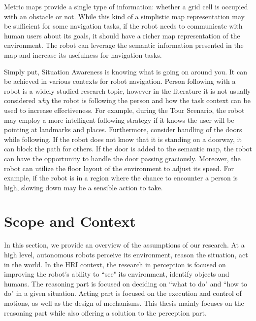 Metric maps provide a single type of information: whether a grid cell is occupied with an obstacle or not. While this kind of a simplistic map representation may be sufficient for some navigation tasks, if the robot needs to communicate with human users about its goals, it should have a richer map representation of the environment. The robot can leverage the semantic information presented in the map and increase its usefulness for navigation tasks.


Simply put, Situation Awareness is knowing what is going on around you. It can be achieved in various contexts for robot navigation. Person following with a robot is a widely studied research topic, however in the literature it is not usually considered \textit{why} the robot is following the person and how the task context can be used to increase effectiveness. For example, during the Tour Scenario, the robot may employ a more intelligent following strategy if it knows the user will be pointing at landmarks and places. Furthermore, consider handling of the doors while following. If the robot does not know that it is standing on a doorway, it can block the path for others. If the door is added to the semantic map, the robot can have the opportunity to handle the door passing graciously. Moreover, the robot can utilize the floor layout of the environment to adjust its speed. For example, if the robot is in a region where the chance to encounter a person is high, slowing down may be a sensible action to take.






\section{Scope and Context}

In this section, we provide an overview of the assumptions of our research.  At a high level, autonomous robots perceive its environment, reason the situation, act in the world. In the HRI context, the research in perception is focused on improving the robot's ability to ``see" its environment, identify objects and humans. The reasoning part is focused on deciding on ``what to do" and ``how to do" in a given situation. Acting part is focused on the execution and control of motions, as well as the design of mechanisms. This thesis mainly focuses on the reasoning part while also offering a solution to the perception part.

